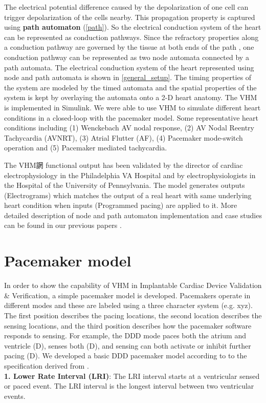 The electrical potential difference caused by the depolarization of one cell can trigger depolarization of the cells nearby. This propagation property is captured using \textbf{path automaton} (\ref{path}). So the electrical conduction system of the heart can be represented as conduction pathways. Since the refractory properties along a conduction pathway are governed by the tissue at both ends of the path \cite{josephson}, one conduction pathway can be represented as two node automata connected by a path automata. The electrical conduction system of the heart represented using node and path automata is shown in \ref{general_setup}. The timing properties of the system are modeled by the timed automata and the spatial properties of the system is kept by overlaying the automata onto a 2-D heart anatomy. The VHM is implemented in Simulink. We were able to use VHM to simulate different heart conditions in a closed-loop with the pacemaker model. Some representative heart conditions including (1) Wenckebach AV nodal response, (2) AV Nodal Reentry Tachycardia (AVNRT), (3) Atrial Flutter (AF), (4) Pacemaker mode-switch operation and (5) Pacemaker mediated tachycardia.

The VHM誷 functional output has been validated by the director of cardiac electrophysiology in the Philadelphia VA Hospital and by electrophysiologists in the Hospital of the University of Pennsylvania. The model generates outputs (Electrograms) which matches the output of a real heart with same underlying heart condition when inputs (Programmed pacing) are applied to it. More detailed description of node and path automaton implementation and case studies can be found in our previous papers \cite{Jiang1}\cite{vhm_iccps11}\cite{embc10}.

\section{Pacemaker model}

In order to show the capability of VHM in Implantable Cardiac Device Validation \& Verification, a simple pacemaker model is developed. Pacemakers operate in different modes and these are labeled using a three character system (e.g. xyz). The first position describes the pacing locations, the second location describes the sensing locations, and the third position describes how the pacemaker software responds to sensing. For example, the DDD mode paces both the atrium and ventricle (D), senses both (D), and sensing can both activate or inhibit further pacing (D). We developed a basic DDD pacemaker model according to  to the specification derived from \cite{challenge}.\\
\textbf{1. Lower Rate Interval (LRI)}:
The LRI interval starts at a ventricular sensed or paced event. The LRI interval is the longest interval between two ventricular events. 

